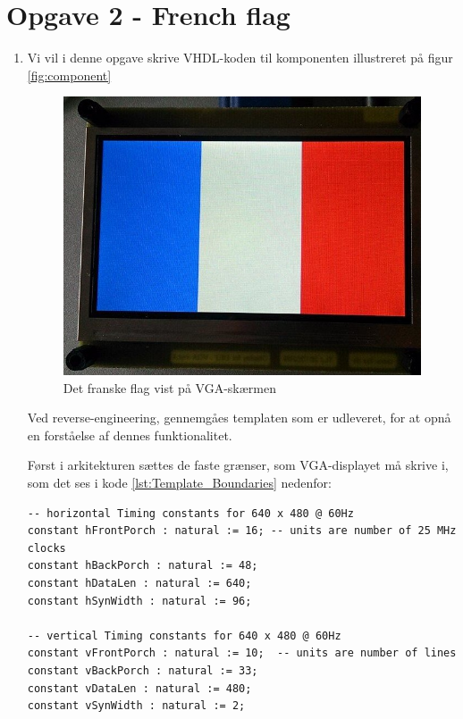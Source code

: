 \section{Opgave 2 - French flag}

\begin{enumerate}[1)]
\item 

	
Vi vil i denne opgave skrive VHDL-koden til komponenten illustreret på figur \ref{fig:component}
	\begin{figure}[h]
		\centering
		\includegraphics[scale=0.4]{pictures/Oevelse8/opg2/franskFlag}
		\caption{Det franske flag vist på VGA-skærmen}
		\label{fig:frenchFlag}
	\end{figure}

Ved reverse-engineering, gennemgåes templaten som er udleveret, for at opnå en forståelse af dennes funktionalitet.
	
Først i arkitekturen sættes de faste grænser, som VGA-displayet må skrive i, som det ses i kode \ref{lst:Template_Boundaries} nedenfor:
	\begin{lstlisting}[caption={Template Boundaries},label={lst:Template_Boundaries}]
-- horizontal Timing constants for 640 x 480 @ 60Hz
constant hFrontPorch : natural := 16; -- units are number of 25 MHz clocks
constant hBackPorch : natural := 48; 
constant hDataLen : natural := 640;
constant hSynWidth : natural := 96;

-- vertical Timing constants for 640 x 480 @ 60Hz 
constant vFrontPorch : natural := 10;  -- units are number of lines
constant vBackPorch : natural := 33;
constant vDataLen : natural := 480;
constant vSynWidth : natural := 2;


\end{lstlisting}
\end{enumerate}
